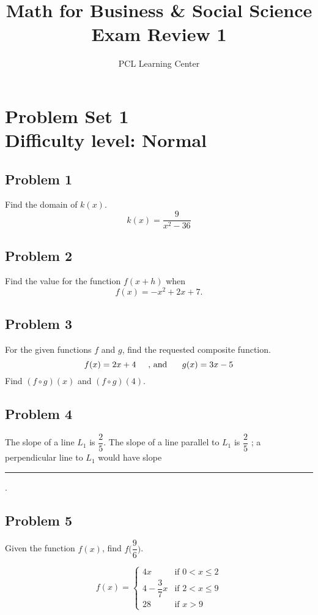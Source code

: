 \documentclass[12pt]{article}
\title{Math for Business \& Social Science\\ Exam Review 1}
\author{PCL Learning Center}
\date{}
\begin{document}
\maketitle

\section*{Problem Set 1\\Difficulty level: Normal}

\subsection*{Problem 1}
Find the domain of \( k(x) \).
\[k(x)=\dfrac{9}{x^2-36}\]

\subsection*{Problem 2}
Find the value for the function \( f(x + h) \) when 
\[
f(x) = -x^2 + 2x + 7.
\]

\subsection*{Problem 3}
For the given functions \( f \) and \( g \), find the requested composite function.
\[f(x)=2x+4 \hspace{0.5cm} \text{, and } \hspace{0.5cm} g(x)=3x-5\]
Find \((f \circ g)(x)\) and \((f \circ g)(4)\).

\subsection*{Problem 4}
The slope of a line \( L_1 \) is \(\dfrac{2}{5}\). The slope of a line parallel to \( L_1 \) is \(\dfrac{2}{5}\) ; a perpendicular line to \( L_1 \) would have slope \rule{2cm}{0.15mm}.

\subsection*{Problem 5}
Given the function \(f(x)\), find \(f\Big(\dfrac{9}{6}\Big)\).

\[
f(x) = 
\begin{cases}
4x & \text{if } 0 < x \leq 2 \\
4 - \dfrac{3}{7}x & \text{if } 2 < x \leq 9 \\
28 & \text{if } x > 9
\end{cases}
\]
\end{document}
